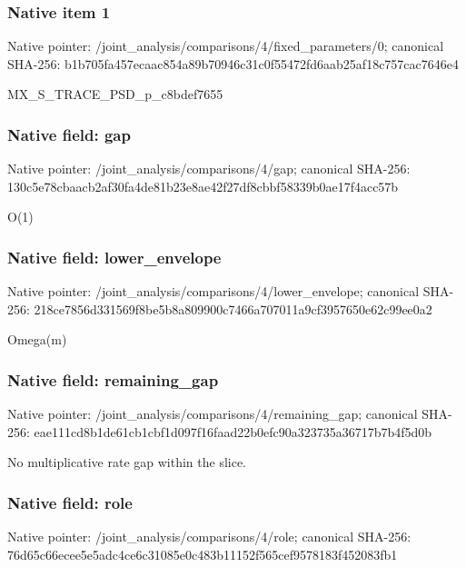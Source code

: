 \documentclass[10pt,a4paper]{article}
\begin{document}
\subsubsection{Native item 1}
Native pointer: /joint\_\allowbreak{}analysis/comparisons/4/fixed\_\allowbreak{}parameters/0; canonical SHA-256: b1b705fa457ecaac854a89b70946c31c0f55472fd6aab25af18c757cac7646e4

\begingroup\raggedright\sloppy MX\_\allowbreak{}S\_\allowbreak{}TRACE\_\allowbreak{}PSD\_\allowbreak{}p\_\allowbreak{}c8bdef7655\par\endgroup

\subsubsection{Native field: gap}
Native pointer: /joint\_\allowbreak{}analysis/comparisons/4/gap; canonical SHA-256: 130c5e78cbaacb2af30fa4de81b23e8ae42f27df8cbbf58339b0ae17f4acc57b

\begingroup\raggedright\sloppy O(1)\par\endgroup

\subsubsection{Native field: lower\_\allowbreak{}envelope}
Native pointer: /joint\_\allowbreak{}analysis/comparisons/4/lower\_\allowbreak{}envelope; canonical SHA-256: 218ce7856d331569f8be5b8a809900c7466a707011a9cf3957650e62c99ee0a2

\begingroup\raggedright\sloppy Omega(m)\par\endgroup

\subsubsection{Native field: remaining\_\allowbreak{}gap}
Native pointer: /joint\_\allowbreak{}analysis/comparisons/4/remaining\_\allowbreak{}gap; canonical SHA-256: eae111cd8b1de61cb1cbf1d097f16faad22b0efc90a323735a36717b7b4f5d0b

\begingroup\raggedright\sloppy No multiplicative rate gap within the slice.\par\endgroup

\subsubsection{Native field: role}
Native pointer: /joint\_\allowbreak{}analysis/comparisons/4/role; canonical SHA-256: 76d65c66ecee5e5adc4ce6c31085e0c483b11152f565cef9578183f452083fb1
\end{document}
